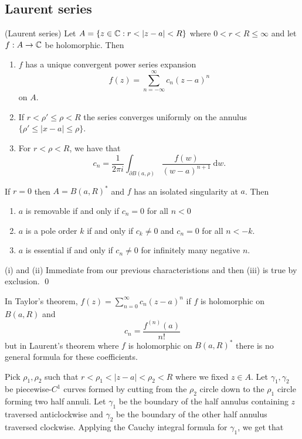 \documentclass{article}
\begin{document}
\subsection{Laurent series}
\begin{theorem}
	(Laurent series) Let $ A=\{z\in \mathbb{C}: r< |z-a|<R\} $ where $ 0<r<R\le \infty $ and let $ f:A\to \mathbb{C} $ be holomorphic. Then 
	\begin{enumerate}
		\item $ f $ has a unique convergent power series expansion
			\[
				f(z)= \sum_{n=-\infty}^\infty c_n(z-a)^n
			\]
			on $ A $.
		\item If $ r< \rho'\le \rho<R $ the series converges uniformly on the annulus $ \{ \rho'\le |x-a|\le \rho \} $.
		\item For $ r< \rho < R $, we have that
			\[
				c_n = \frac 1{2\pi i} \int_{\partial B(a,\rho)} \frac{f(w)}{(w-a)^{n+1}} \ \mathrm dw.
			\]
	\end{enumerate}
\end{theorem}
\begin{corollary}
  If $ r = 0 $ then $ A = B(a,R)^* $ and $ f $ has an isolated singularity at $ a $. Then
  \begin{enumerate}
	  \item $ a $ is removable if and only if $ c_n = 0$ for all $ n< 0 $
	  \item $ a $ is a pole order $ k $ if and only if $ c_k \ne 0 $ and $ c_n = 0 $ for all $ n<-k $.
	  \item $ a $ is essential if and only if $ c_n \ne 0 $ for infinitely many negative $ n $.
  \end{enumerate}
\end{corollary}
\pf (i) and (ii) Immediate from our previous characteristions and then (iii) is true by exclusion. \qed
\begin{remark}
	In Taylor's theorem, $ f(z) = \sum_{n=0}^\infty c_n(z-a)^n $ if $ f $ is holomorphic on $ B(a,R) $ and
	\[
		c_n = \frac{f^{(n)}(a)}{n!}
	\]
	but in Laurent's theorem where $ f $ is holomorphic on $ B(a,R)^* $ there is no general formula for these coefficients.
\end{remark}
\pf Pick $ \rho_1,\rho_2 $ such that $ r<\rho_1<|z-a|<\rho_2 <R $ where we fixed $ z\in A $. Let $ \gamma_1,\gamma_2 $ be piecewise-$ C^1 $ curves formed by cutting from the $ \rho_2 $ circle down to the $ \rho_1 $ circle forming two half annuli. Let $ \gamma_1 $ be the boundary of the half annulus containing $ z $ traversed anticlockwise and $ \gamma_2 $ be the boundary of the other half annulus traversed clockwise. Applying the Cauchy integral formula for $ \gamma_1 $, we get that
\end{document}
